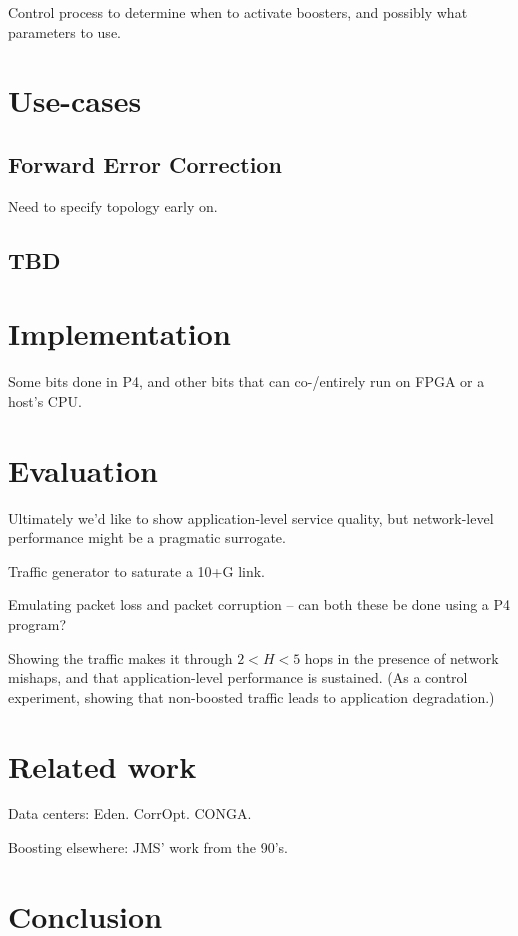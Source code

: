 \documentclass[sigconf]{acmart}
\begin{document}
Control process to determine when to activate boosters, and possibly what parameters to use.

\section{Use-cases}

\subsection{Forward Error Correction}
Need to specify topology early on.

\subsection{TBD}

\section{Implementation}
Some bits done in P4, and other bits that can co-/entirely run on FPGA or a host's CPU.

\section{Evaluation}
Ultimately we'd like to show application-level service quality, but
network-level performance might be a pragmatic surrogate.

Traffic generator to saturate a 10+G link.

Emulating packet loss and packet corruption -- can both these be done using a P4 program?

Showing the traffic makes it through $2 < H < 5$ hops in the presence of
network mishaps, and that application-level performance is sustained.
(As a control experiment, showing that non-boosted traffic leads to application degradation.)

\section{Related work}
Data centers:
Eden.
CorrOpt.
CONGA.

Boosting elsewhere: JMS' work from the 90's.
\section{Conclusion}


 
\end{document}
